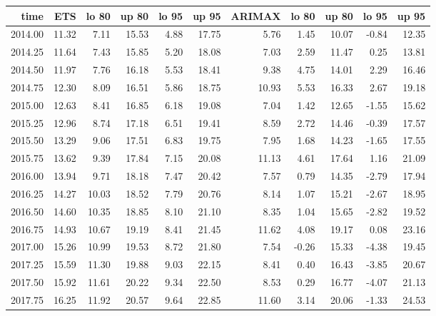 \documentclass[10pt,a4paper]{article}\usepackage[]{graphicx}\usepackage[]{color}
\begin{document}
\begin{table}[ht]
\centering
\begin{tabular}{rrrrrrrrrrr}
  \hline
time & ETS  & lo 80 & up 80 & lo 95 & up 95 & ARIMAX  & lo 80 & up 80 & lo 95 & up 95 \\ 
  \hline
2014.00 & 11.32 & 7.11 & 15.53 & 4.88 & 17.75 & 5.76 & 1.45 & 10.07 & -0.84 & 12.35 \\ 
  2014.25 & 11.64 & 7.43 & 15.85 & 5.20 & 18.08 & 7.03 & 2.59 & 11.47 & 0.25 & 13.81 \\ 
  2014.50 & 11.97 & 7.76 & 16.18 & 5.53 & 18.41 & 9.38 & 4.75 & 14.01 & 2.29 & 16.46 \\ 
  2014.75 & 12.30 & 8.09 & 16.51 & 5.86 & 18.75 & 10.93 & 5.53 & 16.33 & 2.67 & 19.18 \\ 
  2015.00 & 12.63 & 8.41 & 16.85 & 6.18 & 19.08 & 7.04 & 1.42 & 12.65 & -1.55 & 15.62 \\ 
  2015.25 & 12.96 & 8.74 & 17.18 & 6.51 & 19.41 & 8.59 & 2.72 & 14.46 & -0.39 & 17.57 \\ 
  2015.50 & 13.29 & 9.06 & 17.51 & 6.83 & 19.75 & 7.95 & 1.68 & 14.23 & -1.65 & 17.55 \\ 
  2015.75 & 13.62 & 9.39 & 17.84 & 7.15 & 20.08 & 11.13 & 4.61 & 17.64 & 1.16 & 21.09 \\ 
  2016.00 & 13.94 & 9.71 & 18.18 & 7.47 & 20.42 & 7.57 & 0.79 & 14.35 & -2.79 & 17.94 \\ 
  2016.25 & 14.27 & 10.03 & 18.52 & 7.79 & 20.76 & 8.14 & 1.07 & 15.21 & -2.67 & 18.95 \\ 
  2016.50 & 14.60 & 10.35 & 18.85 & 8.10 & 21.10 & 8.35 & 1.04 & 15.65 & -2.82 & 19.52 \\ 
  2016.75 & 14.93 & 10.67 & 19.19 & 8.41 & 21.45 & 11.62 & 4.08 & 19.17 & 0.08 & 23.16 \\ 
  2017.00 & 15.26 & 10.99 & 19.53 & 8.72 & 21.80 & 7.54 & -0.26 & 15.33 & -4.38 & 19.45 \\ 
  2017.25 & 15.59 & 11.30 & 19.88 & 9.03 & 22.15 & 8.41 & 0.40 & 16.43 & -3.85 & 20.67 \\ 
  2017.50 & 15.92 & 11.61 & 20.22 & 9.34 & 22.50 & 8.53 & 0.29 & 16.77 & -4.07 & 21.13 \\ 
  2017.75 & 16.25 & 11.92 & 20.57 & 9.64 & 22.85 & 11.60 & 3.14 & 20.06 & -1.33 & 24.53 \\ 
   \hline
\end{tabular}
\end{table}
\end{document}

